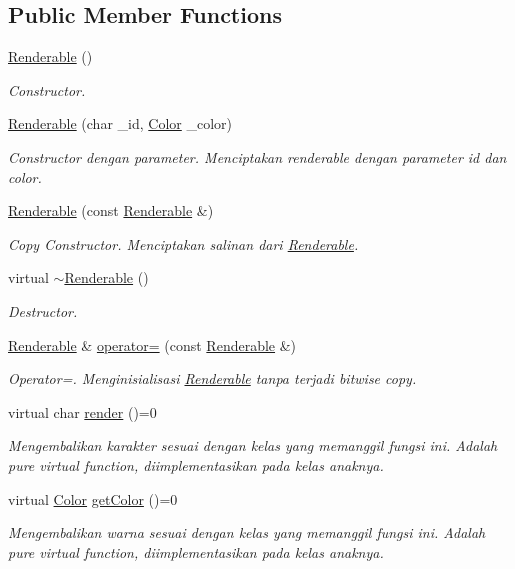 \subsection*{Public Member Functions}
\begin{DoxyCompactItemize}
\item 
\hyperlink{classRenderable_a97a0f6efd2a058dfb003e64e63bdb255}{Renderable} ()
\begin{DoxyCompactList}\small\item\em Constructor. \end{DoxyCompactList}\item 
\hyperlink{classRenderable_a3f5a13e1efadd1ee9d4c3e0585821e92}{Renderable} (char \+\_\+id, \hyperlink{color_8h_ab87bacfdad76e61b9412d7124be44c1c}{Color} \+\_\+color)
\begin{DoxyCompactList}\small\item\em Constructor dengan parameter. Menciptakan renderable dengan parameter id dan color. \end{DoxyCompactList}\item 
\hyperlink{classRenderable_a76ee4c16f0f765d744738f3e5db908dc}{Renderable} (const \hyperlink{classRenderable}{Renderable} \&)
\begin{DoxyCompactList}\small\item\em Copy Constructor. Menciptakan salinan dari \hyperlink{classRenderable}{Renderable}. \end{DoxyCompactList}\item 
virtual \hyperlink{classRenderable_adcffa4f6fc140095255378ea4eea448d}{$\sim$\+Renderable} ()
\begin{DoxyCompactList}\small\item\em Destructor. \end{DoxyCompactList}\item 
\hyperlink{classRenderable}{Renderable} \& \hyperlink{classRenderable_a00dedf7e2ea477fcf5e9e3a5b0d2be47}{operator=} (const \hyperlink{classRenderable}{Renderable} \&)
\begin{DoxyCompactList}\small\item\em Operator=. Menginisialisasi \hyperlink{classRenderable}{Renderable} tanpa terjadi bitwise copy. \end{DoxyCompactList}\item 
virtual char \hyperlink{classRenderable_aafa9280e6dcfa557b3cd675221fd97b4}{render} ()=0
\begin{DoxyCompactList}\small\item\em Mengembalikan karakter sesuai dengan kelas yang memanggil fungsi ini. Adalah pure virtual function, diimplementasikan pada kelas anaknya. \end{DoxyCompactList}\item 
virtual \hyperlink{color_8h_ab87bacfdad76e61b9412d7124be44c1c}{Color} \hyperlink{classRenderable_ab3bcc93b20929c6e92b64223344a73d5}{get\+Color} ()=0
\begin{DoxyCompactList}\small\item\em Mengembalikan warna sesuai dengan kelas yang memanggil fungsi ini. Adalah pure virtual function, diimplementasikan pada kelas anaknya. \end{DoxyCompactList}\end{DoxyCompactItemize}
